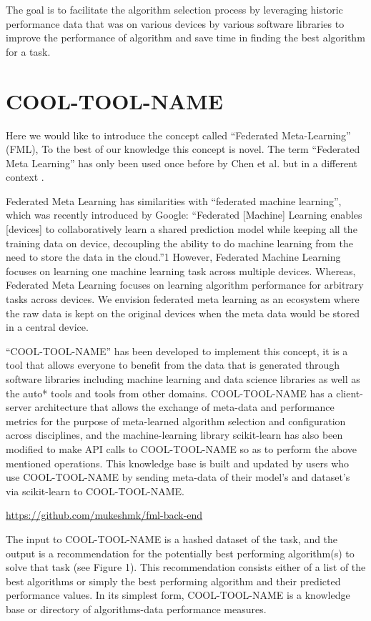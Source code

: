 \documentclass{article}
\begin{document}
The goal is to facilitate the algorithm selection process by leveraging historic performance data that was on various devices by various software libraries to improve the performance of algorithm and save time in finding the best algorithm for a task.


\section{COOL-TOOL-NAME}
Here we would like to introduce the concept called “Federated Meta-Learning” (FML), To the best of our knowledge this concept is novel. The term “Federated Meta Learning” has only been used once before by Chen et al. but in a different context \cite{chen-et-al}. 

Federated Meta Learning has similarities with “federated machine learning”, which was recently introduced by Google: “Federated [Machine] Learning enables [devices] to collaboratively learn a shared prediction model while keeping all the training data on device, decoupling the ability to do machine learning from the need to store the data in the cloud.”1 However, Federated Machine Learning focuses on learning one machine learning task across multiple devices. Whereas, Federated Meta Learning focuses on learning algorithm performance for arbitrary tasks across devices. We envision federated meta learning as an ecosystem where the raw data is kept on the original devices when the meta data would be stored in a central device. 

“COOL-TOOL-NAME” has been developed to implement this concept, it is a tool that allows everyone to benefit from the data that is generated through software libraries including machine learning and data science libraries as well as the auto* tools and tools from other domains. COOL-TOOL-NAME has a client-server architecture that allows the exchange of meta-data and performance metrics for the purpose of meta-learned algorithm selection and configuration across disciplines, and the machine-learning library scikit-learn has also been modified to make API calls to COOL-TOOL-NAME so as to perform the above mentioned operations. This knowledge base is built and updated by users who use COOL-TOOL-NAME by sending meta-data of their model’s and dataset’s  via scikit-learn to COOL-TOOL-NAME.

\url{https://github.com/mukeshmk/fml-back-end}

The input to COOL-TOOL-NAME is a hashed dataset of the task, and the output is a recommendation for the potentially best performing algorithm(s) to solve that task (see Figure 1). This recommendation consists either of a list of the best algorithms or simply the best performing algorithm and their predicted performance values. In its simplest form, COOL-TOOL-NAME is a knowledge base or directory of algorithms-data performance measures.
\end{document}
